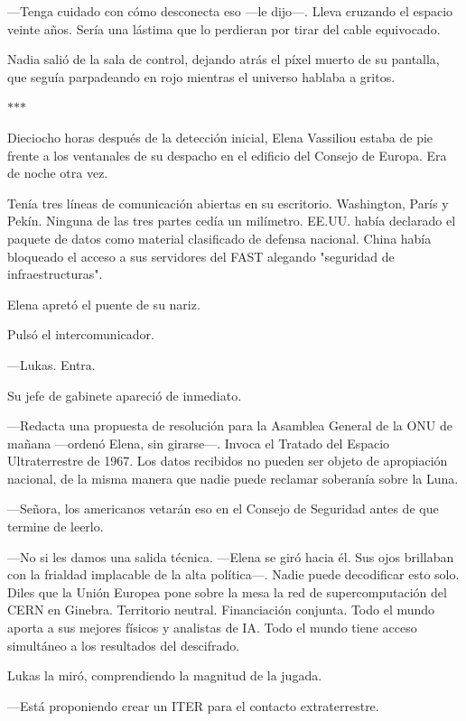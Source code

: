 \documentclass[11pt,a5paper,twoside]{book}
\begin{document}
—Tenga cuidado con cómo desconecta eso —le dijo—. Lleva cruzando el espacio veinte años. Sería una lástima que lo perdieran por tirar del cable equivocado.

Nadia salió de la sala de control, dejando atrás el píxel muerto de su pantalla, que seguía parpadeando en rojo mientras el universo hablaba a gritos.

\vspace{1.5em}
\begin{center}$\ast$\quad$\ast$\quad$\ast$\end{center}
\vspace{1.5em}

Dieciocho horas después de la detección inicial, Elena Vassiliou estaba de pie frente a los ventanales de su despacho en el edificio del Consejo de Europa. Era de noche otra vez.

Tenía tres líneas de comunicación abiertas en su escritorio. Washington, París y Pekín. Ninguna de las tres partes cedía un milímetro. EE.UU. había declarado el paquete de datos como material clasificado de defensa nacional. China había bloqueado el acceso a sus servidores del FAST alegando "seguridad de infraestructuras".

Elena apretó el puente de su nariz.

Pulsó el intercomunicador.

—Lukas. Entra.

Su jefe de gabinete apareció de inmediato.

—Redacta una propuesta de resolución para la Asamblea General de la ONU de mañana —ordenó Elena, sin girarse—. Invoca el Tratado del Espacio Ultraterrestre de 1967. Los datos recibidos no pueden ser objeto de apropiación nacional, de la misma manera que nadie puede reclamar soberanía sobre la Luna.

—Señora, los americanos vetarán eso en el Consejo de Seguridad antes de que termine de leerlo.

—No si les damos una salida técnica. —Elena se giró hacia él. Sus ojos brillaban con la frialdad implacable de la alta política—. Nadie puede decodificar esto solo. Diles que la Unión Europea pone sobre la mesa la red de supercomputación del CERN en Ginebra. Territorio neutral. Financiación conjunta. Todo el mundo aporta a sus mejores físicos y analistas de IA. Todo el mundo tiene acceso simultáneo a los resultados del descifrado.

Lukas la miró, comprendiendo la magnitud de la jugada.

—Está proponiendo crear un ITER para el contacto extraterrestre.
\end{document}
